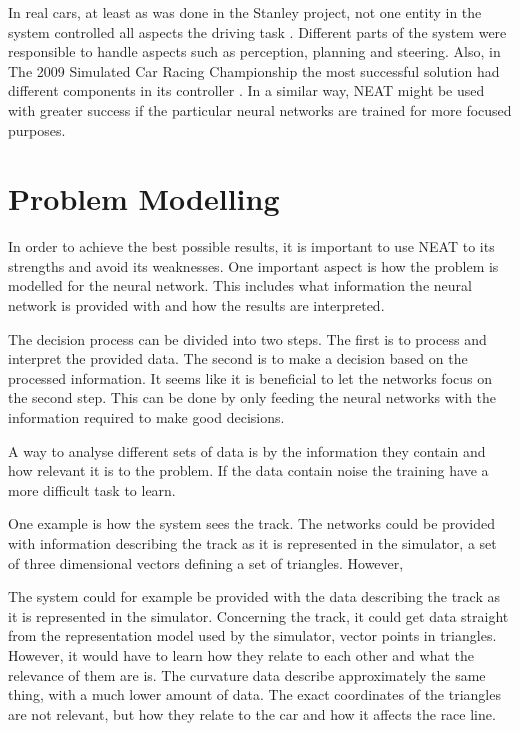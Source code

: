 In real cars, at least as was done in the Stanley project, not one entity in the system controlled all aspects the driving task \cite{Thrun06}. Different parts of the system were responsible to handle aspects such as perception, planning and steering. Also, in The 2009 Simulated Car Racing Championship the most successful solution had different components in its controller \cite{racingChamp2009}. In a similar way, NEAT might be used with greater success if the particular neural networks are trained for more focused purposes.

\section{Problem Modelling}

In order to achieve the best possible results, it is important to use NEAT to its strengths and avoid its weaknesses. One important aspect is how the problem is modelled for the neural network. This includes what information the neural network is provided with and how the results are interpreted.  

The decision process can be divided into two steps. The first is to process and interpret the provided data. The second is to make a decision based on the processed information. It seems like it is beneficial to let the networks focus on the second step. This can be done by only feeding the neural networks with the information required to make good decisions. 


A way to analyse different sets of data is by the information they contain and how relevant it is to the problem. If the data contain noise the training have a more difficult task to learn.


One example is how the system sees the track. The networks could be provided with information describing the track as it is represented in the simulator, a set of three dimensional vectors defining a set of triangles. However, 



The system could for example be provided with the data describing the track as it is represented in the simulator. 
Concerning the track, it could get data straight from the representation model used by the simulator, vector points in triangles. However, it would have to learn how they relate to each other and what the relevance of them are is. The curvature data describe approximately the same thing, with a much lower amount of data. The exact coordinates of the triangles are not relevant, but how they relate to the car and how it affects the race line. 

